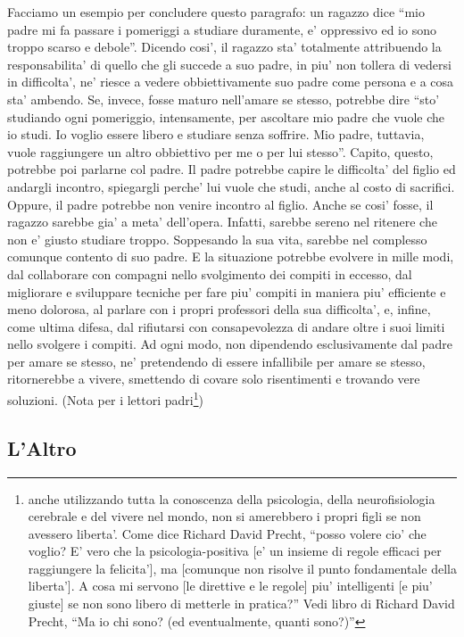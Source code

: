Facciamo un esempio per concludere questo paragrafo: un ragazzo dice ``mio padre mi fa passare i pomeriggi a studiare duramente, e' oppressivo ed io sono troppo scarso e debole''. Dicendo cosi', il ragazzo sta' totalmente attribuendo la responsabilita' di quello che gli succede a suo padre, in piu' non tollera di vedersi in difficolta', ne' riesce a vedere obbiettivamente suo padre come persona e a cosa sta' ambendo. Se, invece, fosse maturo nell'amare se stesso, potrebbe dire ``sto' studiando ogni pomeriggio, intensamente, per ascoltare mio padre che vuole che io studi. Io voglio essere libero e studiare senza soffrire. Mio padre, tuttavia, vuole raggiungere un altro obbiettivo per me o per lui stesso''.  Capito, questo, potrebbe poi parlarne col padre. Il padre potrebbe capire le difficolta' del figlio ed andargli incontro, spiegargli perche' lui vuole che studi, anche al costo di sacrifici. Oppure, il padre potrebbe non venire incontro al figlio. Anche se cosi' fosse, il ragazzo sarebbe gia' a meta' dell'opera. Infatti, sarebbe sereno nel ritenere che non e' giusto studiare troppo. Soppesando la sua vita, sarebbe nel complesso comunque contento di suo padre. E la situazione potrebbe evolvere in mille modi, dal collaborare con compagni nello svolgimento dei compiti in eccesso,  dal migliorare e sviluppare tecniche per fare piu' compiti in maniera piu' efficiente e meno dolorosa, al parlare con i propri professori della sua difficolta', e, infine, come ultima difesa, dal rifiutarsi con consapevolezza di andare oltre i suoi limiti nello svolgere i compiti. Ad ogni modo, non dipendendo esclusivamente dal padre per amare se stesso, ne' pretendendo di essere infallibile per amare se stesso, ritornerebbe a vivere, smettendo di covare solo risentimenti e trovando vere soluzioni. (Nota per i lettori padri\footnote{anche utilizzando tutta la conoscenza della psicologia, della neurofisiologia cerebrale e del vivere nel mondo, non si amerebbero i propri figli se non avessero liberta'. Come dice Richard David Precht, ``posso volere cio' che voglio? E' vero che la psicologia-positiva [e' un insieme di regole efficaci per raggiungere la felicita'], ma [comunque non risolve il punto fondamentale della liberta']. A cosa mi servono [le direttive e le regole] piu' intelligenti [e piu' giuste] se non sono libero di metterle in pratica?'' Vedi libro di Richard David Precht, ``Ma io chi sono? (ed eventualmente, quanti sono?)''})

\subsection{L'Altro}
\label{altrui}


